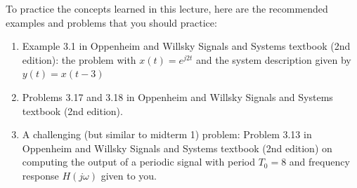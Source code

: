 To practice the concepts learned in this lecture, here are the recommended examples and problems that you should practice:
\begin{enumerate}
  \item Example 3.1 in Oppenheim and Willsky Signals and Systems textbook (2nd edition): the problem with $x(t) = e^{j2t}$ and the system description given by $y(t) = x(t-3)$
  \item Problems 3.17 and 3.18 in Oppenheim and Willsky Signals and Systems textbook (2nd edition).
  \item A challenging (but similar to midterm 1) problem: Problem 3.13 in Oppenheim and Willsky Signals and Systems textbook (2nd edition) on computing the output of a periodic signal with period $T_0 = 8$ and frequency response $H(j\omega)$ given to you.
\end{enumerate}
